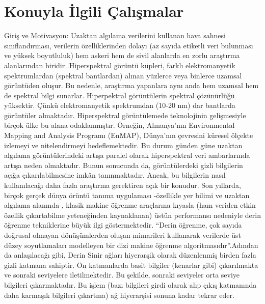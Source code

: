 \chapter{Konuyla İlgili Çalışmalar}

Giriş ve Motivasyon: Uzaktan algılama verilerini kullanan hava sahnesi sınıflandırması, verilerin özelliklerinden dolayı (az sayıda etiketli veri bulunması ve yüksek boyutluluk) hem askeri hem de sivil alanlarda en zorlu araştırma alanlarından biridir \cite{li2018deep}.Hiperspektral görüntü küpleri, farklı elektromanyetik spektrumlardan (spektral bantlardan) alınan yüzlerce veya binlerce uzamsal görüntüden oluşur. Bu nedenle, araştırma yapanlara aynı anda hem uzamsal hem de spektral bilgi sunarlar. Hiperpektral görüntülerin spektral çözünürlüğü yüksektir. Çünkü elektromanyetik spektrumdan (10-20 nm) dar bantlarda görüntüler almaktadır. Hiperspektral görüntülemede teknolojinin gelişmesiyle birçok ülke bu alana odaklanmıştır. Örneğin, Almanya’nın Environmental Mapping and Analysis Programı (EnMAP), Dünya'nın çevresini küresel ölçekte izlemeyi ve nitelendirmeyi hedeflemektedir. Bu durum günden güne uzaktan algılama görüntülerindeki artışa paralel olarak hiperspektral veri ambarlarında artışa neden olmaktadır. Bunun sonucunda da, görüntülerdeki gizli bilgilerin açığa çıkarılabilmesine imkân tanınmaktadır. Ancak, bu bilgilerin nasıl kullanılacağı daha fazla araştırma gerektiren açık bir konudur. Son yıllarda, birçok gerçek dünya örüntü tanıma uygulaması -özellikle yer bilimi ve uzaktan algılama alanında-, klasik makine öğrenme araçlarına kıyasla (ham veriden etkin özellik çıkartabilme yeteneğinden kaynaklanan) üstün performansı nedeniyle derin öğrenme tekniklerine büyük ilgi göstermektedir. “Derin öğrenme, çok sayıda doğrusal olmayan dönüşümlerden oluşan mimarileri kullanarak verilerde üst düzey soyutlamaları modelleyen bir dizi makine öğrenme algoritmasıdır”\cite{yan2018application}.Adından da anlaşılacağı gibi, Derin Sinir ağları hiyerarşik olarak düzenlenmiş birden fazla gizli katmana sahiptir. Ön katmanlarda basit bilgiler (kenarlar gibi) çıkarılmakta ve sonraki seviyelere iletilmektedir. Bu şekilde, sonraki seviyeler orta seviye bilgileri çıkarmaktadır. Bu işlem (bazı bilgileri girdi olarak alıp çıkış katmanında daha karmaşık bilgileri çıkartma) ağ hiyerarşisi sonuna kadar tekrar eder.\\
\newpage

